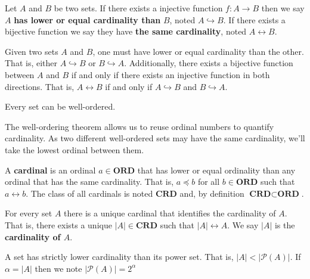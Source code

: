 \documentclass{bareminimum}
\def\ordinals{\textbf{ORD}}
\def\cardinals{\textbf{CRD}}
\def\ordleq{\preceq}
\def\crdleq{\hookrightarrow}
\def\crdeq{\leftrightarrow}
\begin{document}
\begin{defn}
	Let $A$  and $B$ be two sets. If there exists a injective function $f : A \to B$ then we say $A$ \textbf{has lower or equal cardinality than} $B$, noted $A \crdleq B$. If there exists a bijective function we say they have \textbf{the same cardinality}, noted $A \crdeq B$.
\end{defn}

\begin{prop}
	Given two sets $A$ and $B$, one must have lower or equal cardinality than the other. That is, either $A \crdleq B$ or $B \crdleq A$. Additionally, there exists a bijective function between $A$ and $B$ if and only if there exists an injective function in both directions. That is, $A \crdeq B$ if and only if $A \crdleq B$ and $B \crdleq A$.
\end{prop}

\begin{prop}
	Every set can be well-ordered.
\end{prop}

\begin{remark}
	The well-ordering theorem allows us to reuse ordinal numbers to quantify cardinality. As two different well-ordered sets may have the same cardinality, we'll take the lowest ordinal between them.
\end{remark}

\begin{defn}
	A \textbf{cardinal}  \marginleft{Cardinals: $\cardinals$} is an ordinal $a \in \ordinals$ that has lower or equal ordinality than any ordinal that has the same cardinality. That is, $a \ordleq b$ for all $b \in \ordinals$ such that $a \crdeq b$. The class of all cardinals is noted $\cardinals$ and, by definition $\cardinals \subset \ordinals$.
\end{defn}

\begin{prop}
	For every  set $A$ there is a unique cardinal that identifies the cardinality of $A$. That is, there exists a unique $|A| \in \cardinals$ such that $|A| \crdeq A$. We say $|A|$ is the \textbf{cardinality of $A$}.
\end{prop}

\begin{prop}
	A set has strictly lower cardinality than its power set. That is, $|A| < |\mathcal{P}(A)|$. If $\alpha = |A|$ then we note $|\mathcal{P}(A)| = 2^\alpha$
\end{prop}
\end{document}
